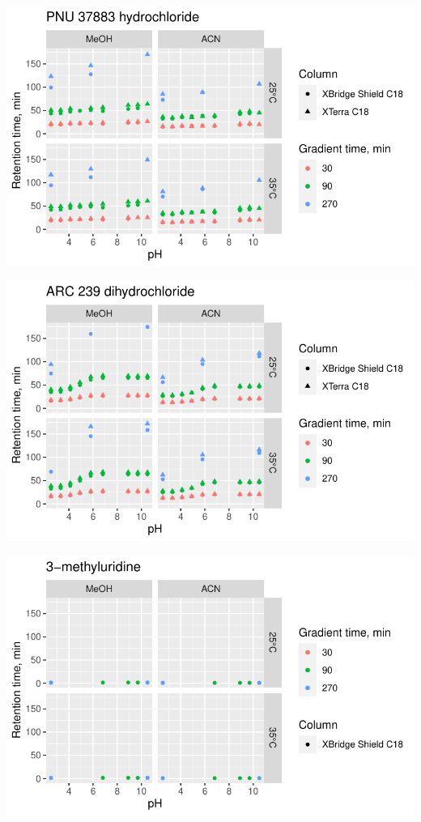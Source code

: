 \documentclass[
  letterpaper,
  DIV=11,
  numbers=noendperiod]{scrreprt}
\begin{document}
\includegraphics{index_files/figure-pdf/unnamed-chunk-4-171.pdf}

\includegraphics{index_files/figure-pdf/unnamed-chunk-4-172.pdf}

\includegraphics{index_files/figure-pdf/unnamed-chunk-4-173.pdf}
\end{document}
